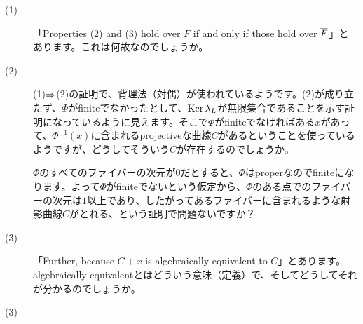 \begin{que} ${}$
\begin{description}
  \item[(1)] 「Properties (2) and (3) hold over $F$ if and only if those hold over $\overline{F}$」とあります。これは何故なのでしょうか。
  \item[(2)] (1)$\Rightarrow$(2)の証明で、背理法（対偶）が使われているようです。(2)が成り立たず、$\Phi$がfiniteでなかったとして、$\operatorname{Ker} {\lambda}_L$が無限集合であることを示す証明になっているように見えます。そこで$\Phi$がfiniteでなければある$x$があって、$\Phi^{-1}(x)$に含まれるprojectiveな曲線$C$があるということを使っているようですが、どうしてそういう$C$が存在するのでしょうか。

  $\Phi$のすべてのファイバーの次元が$0$だとすると、$\Phi$はproperなのでfiniteになります。よって$\Phi$がfiniteでないという仮定から、$\Phi$のある点でのファイバーの次元は$1$以上であり、したがってあるファイバーに含まれるような射影曲線$C$がとれる、という証明で問題ないですか？
  \item[(3)] 「Further, because $C + x$ is algebraically equivalent to $C$」とあります。algebraically equivalentとはどういう意味（定義）で、そしてどうしてそれが分かるのでしょうか。
  \item[(3)]
\end{description}

\end{que}
